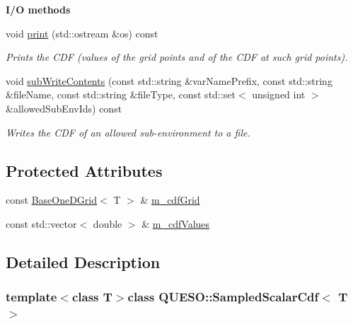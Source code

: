 \begin{Indent}{\bf I/\-O methods}\par
\begin{DoxyCompactItemize}
\item 
void \hyperlink{class_q_u_e_s_o_1_1_sampled_scalar_cdf_a1ae05088dd70e2432a52577ba6dca468}{print} (std\-::ostream \&os) const 
\begin{DoxyCompactList}\small\item\em Prints the C\-D\-F (values of the grid points and of the C\-D\-F at such grid points). \end{DoxyCompactList}\item 
void \hyperlink{class_q_u_e_s_o_1_1_sampled_scalar_cdf_af597534e752c2974448d7fd071266c59}{sub\-Write\-Contents} (const std\-::string \&var\-Name\-Prefix, const std\-::string \&file\-Name, const std\-::string \&file\-Type, const std\-::set$<$ unsigned int $>$ \&allowed\-Sub\-Env\-Ids) const 
\begin{DoxyCompactList}\small\item\em Writes the C\-D\-F of an allowed sub-\/environment to a file. \end{DoxyCompactList}\end{DoxyCompactItemize}
\end{Indent}
\subsection*{Protected Attributes}
\begin{DoxyCompactItemize}
\item 
const \hyperlink{class_q_u_e_s_o_1_1_base_one_d_grid}{Base\-One\-D\-Grid}$<$ T $>$ \& \hyperlink{class_q_u_e_s_o_1_1_sampled_scalar_cdf_a58d6744bac9ce8d906839bf381517f4a}{m\-\_\-cdf\-Grid}
\item 
const std\-::vector$<$ double $>$ \& \hyperlink{class_q_u_e_s_o_1_1_sampled_scalar_cdf_ab8cf649637f31cc75c9f676d5927c10f}{m\-\_\-cdf\-Values}
\end{DoxyCompactItemize}


\subsection{Detailed Description}
\subsubsection*{template$<$class T$>$class Q\-U\-E\-S\-O\-::\-Sampled\-Scalar\-Cdf$<$ T $>$}

